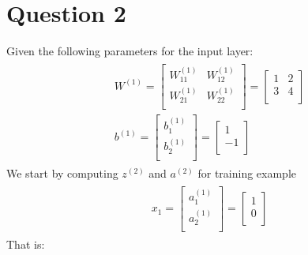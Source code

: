 \documentclass[leqno]{article}
\begin{document}
\section*{Question 2} Given the following parameters for the input layer:
\begin{gather*}
\begin{split}
&W^{(1)} =
  \begin{bmatrix}
  W_{11}^{(1)} & W_{12}^{(1)}\\
  W_{21}^{(1)} & W_{22}^{(1)}\\ 
  \end{bmatrix}
  =
  \begin{bmatrix}
  1 & 2\\
  3 & 4\\ 
  \end{bmatrix}
\\
&b^{(1)} =
   \begin{bmatrix}
  b_1^{(1)} \\
  b_2^{(1)}\\ 
  \end{bmatrix}
  =
  \begin{bmatrix}
  1 \\
  -1\\ 
  \end{bmatrix}
\end{split}
\end{gather*}
We start by computing $z^{(2)}$ and $a^{(2)}$ for training example 
\begin{gather*}
\begin{split}
&x_1 =
  \begin{bmatrix}
  a_1^{(1)}\\
  a_2^{(1)}\\ 
  \end{bmatrix}
  =
  \begin{bmatrix}
  1\\
  0\\ 
  \end{bmatrix}
\end{split}
\end{gather*}
That is: 
\end{document}
